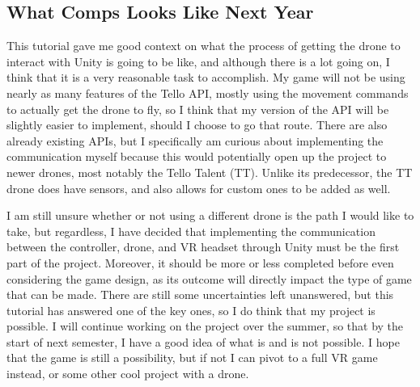 \documentclass[10pt,twocolumn]{article}
\begin{document}
\subsection{What Comps Looks Like Next Year}
This tutorial gave me good context on what the process of getting the drone to interact with Unity is going to be like, and although there is a lot going on, I think that it is a very reasonable task to accomplish. My game will not be using nearly as many features of the Tello API, mostly using the movement commands to actually get the drone to fly, so I think that my version of the API will be slightly easier to implement, should I choose to go that route. There are also already existing APIs, but I specifically am curious about implementing the communication myself because this would potentially open up the project to newer drones, most notably the Tello Talent (TT). Unlike its predecessor, the TT drone does have sensors, and also allows for custom ones to be added as well.

I am still unsure whether or not using a different drone is the path I would like to take, but regardless, I have decided that implementing the communication between the controller, drone, and VR headset through Unity must be the first part of the project. Moreover, it should be more or less completed before even considering the game design, as its outcome will directly impact the type of game that can be made. There are still some uncertainties left unanswered, but this tutorial has answered one of the key ones, so I do think that my project is possible. I will continue working on the project over the summer, so that by the start of next semester, I have a good idea of what is and is not possible. I hope that the game is still a possibility, but if not I can pivot to a full VR game instead, or some other cool project with a drone. 
\end{document}
